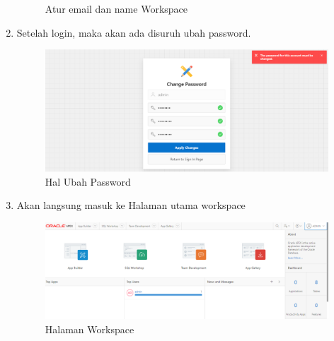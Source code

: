 \begin{enumerate}
\begin{figure}[!htbp]
        \caption{Atur email dan name Workspace}
    \end{figure}
    \item Setelah login, maka akan ada disuruh ubah password.
    \begin{figure}[!htbp]
        \centering
        \includegraphics[scale=0.3]{figures/n9.PNG}
        \caption{Hal Ubah Password}
    \end{figure}
\newpage
    \item Akan langsung masuk ke Halaman utama workspace
    \begin{figure}[!htbp]
        \centering
        \includegraphics[scale=0.4]{figures/wor1.PNG}
        \caption{Halaman Workspace}
    \end{figure}
\end{enumerate}
